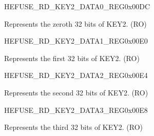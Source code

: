 \begin{register}{H}{EFUSE\_RD\_KEY2\_DATA0\_REG}{0x00DC}\label{regdesc:EFUSERDKEY2DATA0REG}
%
\regnewline%
\begin{regdesc}\begin{reglist}
\label{fielddesc:EFUSEKEY2DATA0}\item [EFUSE\_KEY2\_DATA0] Represents the zeroth 32 bits of KEY2. (RO)
\end{reglist}\end{regdesc}
\end{register}


\begin{register}{H}{EFUSE\_RD\_KEY2\_DATA1\_REG}{0x00E0}\label{regdesc:EFUSERDKEY2DATA1REG}
%
\regnewline%
\begin{regdesc}\begin{reglist}
\label{fielddesc:EFUSEKEY2DATA1}\item [EFUSE\_KEY2\_DATA1] Represents the first 32 bits of KEY2. (RO)
\end{reglist}\end{regdesc}
\end{register}


\begin{register}{H}{EFUSE\_RD\_KEY2\_DATA2\_REG}{0x00E4}\label{regdesc:EFUSERDKEY2DATA2REG}
%
\regnewline%
\begin{regdesc}\begin{reglist}
\label{fielddesc:EFUSEKEY2DATA2}\item [EFUSE\_KEY2\_DATA2] Represents the second 32 bits of KEY2. (RO)
\end{reglist}\end{regdesc}
\end{register}


\begin{register}{H}{EFUSE\_RD\_KEY2\_DATA3\_REG}{0x00E8}\label{regdesc:EFUSERDKEY2DATA3REG}
%
\regnewline%
\begin{regdesc}\begin{reglist}
\label{fielddesc:EFUSEKEY2DATA3}\item [EFUSE\_KEY2\_DATA3] Represents the third 32 bits of KEY2. (RO)
\end{reglist}\end{regdesc}
\end{register}


